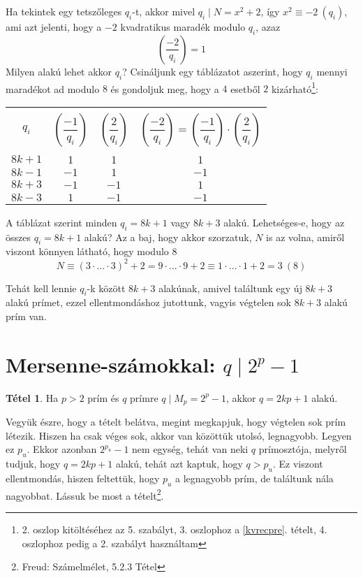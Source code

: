 \documentclass[12pt]{book}
\theoremstyle{plain} %
\theoremstyle{definition} %
\newtheorem{theo/}{Tétel}[section]
\newenvironment{theo}
  {\renewcommand{\qedsymbol}{$\clubsuit$}%
   \pushQED{\qed}\begin{theo/}}
  {\popQED\end{theo/}}
\theoremstyle{remark}
\renewcommand\qedsymbol{$\blacksquare$}
\numberwithin{equation}{section}  %
\begin{document}
	Ha tekintek egy tetszőleges $q_i$-t, akkor mivel $q_i\mid N = x^2+2$, így $x^2\equiv -2\ (q_i)$, ami azt jelenti, hogy a $-2$ kvadratikus maradék modulo $q_i$, azaz
	\[ \left( \dfrac{-2}{q_i} \right) = 1\]
	Milyen alakú lehet akkor $q_i$? Csináljunk egy táblázatot aszerint, hogy $q_i$ mennyi maradékot ad modulo $8$ és gondoljuk meg, hogy a $4$ esetből $2$ kizárható\footnote{2. oszlop kitöltéséhez az 5. szabályt, 3. oszlophoz a \ref{kvrecpre}. tételt, 4. oszlophoz pedig a 2. szabályt használtam}:
	
	\begin{center}
		\begin{tabular}{ | c | c | c | c | }
			\hline
			& & & \\
			$q_i$ & $\left( \dfrac{-1}{q_i} \right)$ & $\left( \dfrac{2}{q_i} \right)$ & $\left( \dfrac{-2}{q_i} \right) = \left( \dfrac{-1}{q_i} \right)\cdot \left( \dfrac{2}{q_i} \right)$ \\
			& & & \\
			\hline 
			$8k+1$ & $1$ & $1$ & $1$\\  
			\hline
			$8k-1$ & $-1$ & $1$ & $-1$\\
			\hline  
			$8k+3$ & $-1$ & $-1$ & $1$\\  
			\hline
			$8k-3$ & $1$ & $-1$ & $-1$\\
			\hline  
		\end{tabular}
	\end{center}

	A táblázat szerint minden $q_i=8k+1$ vagy $8k+3$ alakú. Lehetséges-e, hogy az összes $q_i=8k+1$ alakú? Az a baj, hogy akkor szorzatuk, $N$ is az volna, amiről viszont könnyen látható, hogy modulo $8$
	\[ N \equiv (3\cdot \ldots \cdot 3)^2 + 2 = 9\cdot \ldots \cdot 9 + 2 \equiv 1\cdot \ldots \cdot 1 + 2 = 3  \ (8)   \]
	
	Tehát kell lennie $q_i$-k között $8k+3$ alakúnak, amivel találtunk egy új $8k+3$ alakú prímet, ezzel ellentmondáshoz jutottunk, vagyis végtelen sok $8k+3$ alakú prím van.
	
	\section{Mersenne-számokkal: $q\mid 2^p-1$}
	
	\begin{theo}
		Ha $p>2$ prím és $q$ prímre $q\mid M_p = 2^p - 1$, akkor $q = 2kp+1$ alakú.
	\end{theo}

	Vegyük észre, hogy a tételt belátva, megint megkapjuk, hogy végtelen sok prím létezik. Hiszen ha csak véges sok, akkor van közöttük utolsó, legnagyobb. Legyen ez $p_u$. Ekkor azonban $2^{p_u} - 1$ nem egység, tehát van neki $q$ prímosztója, melyről tudjuk, hogy $q = 2kp + 1$ alakú, tehát azt kaptuk, hogy $q>p_u$. Ez viszont ellentmondás, hiszen feltettük, hogy $p_u$ a legnagyobb prím, de találtunk nála nagyobbat. Lássuk be most a tételt\footnote{Freud: Számelmélet, 5.2.3 Tétel}.
	
\end{document}
